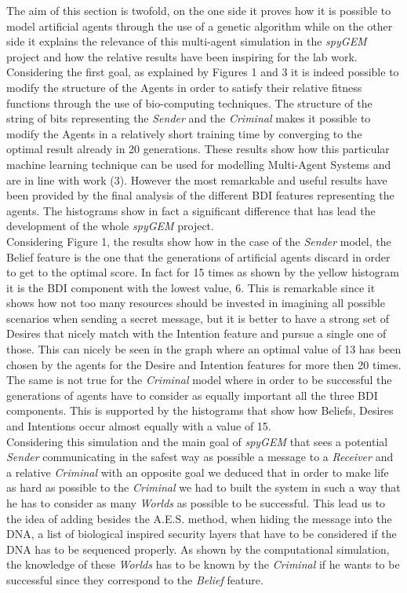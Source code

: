 \documentclass[a4paper]{article}
\begin{document}
The aim of this section is twofold, on the one side it proves how it is possible to model artificial agents through the use of a genetic algorithm while on the other side it explains the relevance of this multi-agent simulation in the \textit{spyGEM} project and how the relative results have been inspiring for the lab work. \\
Considering the first goal, as explained by Figures 1 and 3 it is indeed possible to modify the structure of the Agents in order to satisfy their relative fitness functions through the use of bio-computing techniques. The structure of the string of bits representing the \textit{Sender} and the \textit{Criminal} makes it possible to modify the Agents in a relatively short training time by converging to the optimal result already in 20 generations. These results show how this particular machine learning technique can be used for modelling Multi-Agent Systems and are in line with work (3). However the most remarkable and useful results have been provided by the final analysis of the different BDI features representing the agents. The histograms show in fact a significant difference that has lead the development of the whole \textit{spyGEM} project. \\         
Considering Figure 1, the results show how in the case of the \textit{Sender} model, the Belief feature is the one that the generations of artificial agents discard in order to get to the optimal score. In fact for 15 times as shown by the yellow histogram it is the BDI component with the lowest value, 6. This is remarkable since it shows how not too many resources should be invested in imagining all possible scenarios when sending a secret message, but it is better to have a strong set of Desires that nicely match with the Intention feature and pursue a single one of those. This can nicely be seen in the graph where an optimal value of 13 has been chosen by the agents for the Desire and Intention features for more then 20 times. The same is not true for the \textit{Criminal} model where in order to be successful the generations of agents have to consider as equally important all the three BDI components. This is supported by the histograms that show how Beliefs, Desires and Intentions occur almost equally with a value of 15. \\
Considering this simulation and the main goal of \textit{spyGEM} that sees a potential \textit{Sender} communicating in the safest way as possible a message to a \textit{Receiver} and a relative \textit{Criminal} with an opposite goal we deduced that in order to make life as hard as possible to the \textit{Criminal} we had to built the system in such a way that he has to consider as many \textit{Worlds} as possible to be successful. This lead us to the idea of adding besides the A.E.S. method, when hiding the message into the DNA, a list of biological inspired security layers that have to be considered if the DNA has to be sequenced properly. As shown by the computational simulation, the knowledge of these \textit{Worlds} has to be known by the \textit{Criminal} if he wants to be successful since they correspond to the \textit{Belief} feature. \\
\end{document}
